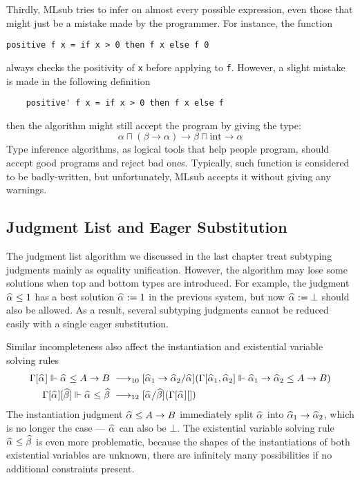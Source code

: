 Thirdly, MLsub tries to infer on almost every possible expression,
even those that might just be a mistake made by the programmer.
For instance, the function
\begin{verbatim}
positive f x = if x > 0 then f x else f 0
\end{verbatim}
always checks the positivity of \verb|x| before applying to \verb|f|.
However, a slight mistake is made in the following definition
\begin{verbatim}
    positive' f x = if x > 0 then f x else f
\end{verbatim}
then the algorithm might still accept the program by giving the type:
$$\alpha \sqcap (\beta \to \alpha) \to \beta \sqcap \text{int} \to \alpha$$
Type inference algorithms, as logical tools that help people program,
should accept good programs and reject bad ones.
Typically, such function is considered to be badly-written,
but unfortunately, MLsub accepts it without giving any warnings.

\subsection{Judgment List and Eager Substitution}

The judgment list algorithm we discussed in the last chapter treat subtyping
judgments mainly as equality unification.
However, the algorithm may lose some solutions
when top and bottom types are introduced.
For example,
the judgment $\al \le 1$ has a best solution $\al := 1$ in the previous system,
but now $\al := \bot$ should also be allowed.
As a result, several subtyping judgments cannot be reduced easily with a single
eager substitution.

Similar incompleteness also affect the instantiation and existential variable solving rules
\begin{gather*}
\begin{aligned}
    \Gm[\al] \Vdash \al \le A\to B &\rrule{10} [\al[1]\to\al[2]/\al] (\Gm[\al[1], \al[2]] \Vdash \al[1]\to \al[2] \le A \to B)\\
    \Gm[\al][\bt] \Vdash \al \le \bt &\rrule{12} [\al/\bt](\Gm[\al][])
\end{aligned}
\end{gather*}
The instantiation judgment $\al \le A \to B$ immediately split $\al$ into $\al[1] \to \al[2]$,
which is no longer the case --- $\al$ can also be $\bot$.
The existential variable solving rule $\al \le \bt$ is even more problematic,
because the shapes of the instantiations of both existential variables are unknown,
there are infinitely many possibilities if no additional constraints present.


